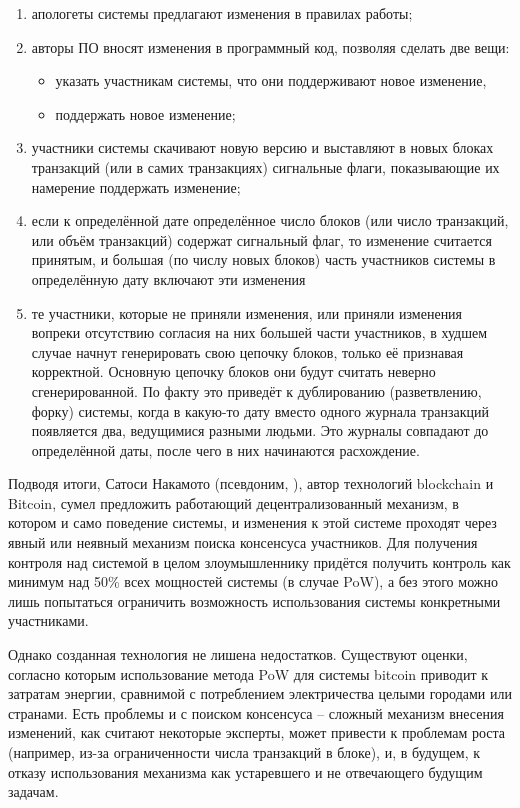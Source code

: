 \begin{enumerate}
	\item апологеты системы предлагают изменения в правилах работы;
	\item авторы ПО вносят изменения в программный код, позволяя сделать две вещи:
	\begin{itemize}
		\item указать участникам системы, что они поддерживают новое изменение,
		\item поддержать новое изменение;
	\end{itemize}
	\item участники системы скачивают новую версию и выставляют в новых блоках транзакций (или в самих транзакциях) сигнальные флаги, показывающие их намерение поддержать изменение;
	\item если к определённой дате определённое число блоков (или число транзакций, или объём транзакций) содержат сигнальный флаг, то изменение считается принятым, и большая (по числу новых блоков) часть участников системы в определённую дату включают эти изменения
	\item те участники, которые не приняли изменения, или приняли изменения вопреки отсутствию согласия на них большей части участников, в худшем случае начнут генерировать свою цепочку блоков, только её признавая корректной. Основную цепочку блоков они будут считать неверно сгенерированной. По факту это приведёт к дублированию (разветвлению, форку) системы, когда в какую-то дату вместо одного журнала транзакций появляется два, ведущимися разными людьми. Это журналы совпадают до определённой даты, после чего в них начинаются расхождение.
\end{enumerate}

Подводя итоги, Сатоси Накамото (псевдоним, ), автор технологий blockchain и Bitcoin, сумел предложить работающий децентрализованный механизм, в котором и само поведение системы, и изменения к этой системе проходят через явный или неявный механизм поиска консенсуса участников. Для получения контроля над системой в целом злоумышленнику придётся получить контроль как минимум над 50\% всех мощностей системы (в случае PoW), а без этого можно лишь попытаться ограничить возможность использования системы конкретными участниками.

Однако созданная технология не лишена недостатков. Существуют оценки, согласно которым использование метода PoW для системы bitcoin приводит к затратам энергии, сравнимой с потреблением электричества целыми городами или странами. Есть проблемы и с поиском консенсуса -- сложный механизм внесения изменений, как считают некоторые эксперты, может привести к проблемам роста (например, из-за ограниченности числа транзакций в блоке), и, в будущем, к отказу использования механизма как устаревшего и не отвечающего будущим задачам.

